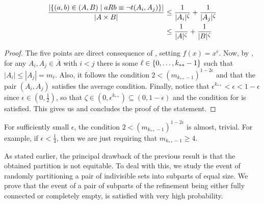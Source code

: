 \begin{lemma}[Claim 4.10]
\begin{enumerate}
\[\begin{split}
                        \frac{|\{ (a,b) \in (A,B) \mid a R b \equiv \neg t(A_i,A_j) \}|}{|A \times B|}
                            &\leq \frac{1}{|A_i|^\zeta} + \frac{1}{|A_j|^\zeta} \\
                            &\leq \frac{1}{|A|^\zeta} + \frac{1}{|B|^\zeta}
                    \end{split}
                \]
        \end{enumerate}
        \begin{proof}
            The five points are direct consequence of ,
            setting $f(x) = x^\epsilon$.
            Now, by , for any $A_i, A_j \in \overline{A}$ with $i < j$
            there is some $\ell \in \{ 0, \dots, k_{**}-1 \}$ such that $|A_i| \leq |A_j| = m_\ell$.
            Also, it follows the condition $2 < (m_{k_{**}-1})^{1-2\epsilon}$ and 
            that the pair $(A_i,A_j)$ satisfies the average condition.
            Finally, notice that $\epsilon^{k_{**}} < \epsilon < 1 - \epsilon$ since $\epsilon \in (0, \frac{1}{2})$,
            so that $\zeta \in (0, \epsilon ^ {k_{**}}) \subseteq (0, 1 - \epsilon)$ and the condition for
             is satisfied.
            This gives us  and concludes the proof of the statement.
        \end{proof}
    \end{lemma}

    \begin{remark}
        For sufficiently small $\epsilon$, the condition $2 < (m_{k_{**}-1})^{1-2\epsilon}$ is almost, trivial.
        For example, if $\epsilon < \frac{1}{4}$, then we are just requiring that $m_{k_{**}-1} \geq 4$.
    \end{remark}

    As stated earlier, the principal drawback of the previous result is that the obtained partition is not equitable.
    To deal with this, we study the event of randomly partitioning a pair of indivisible sets
    into subparts of equal size.
    We prove that the event of a pair of subparts of the refinement being either fully connected or completely empty,
    is satisfied with very high probability.

